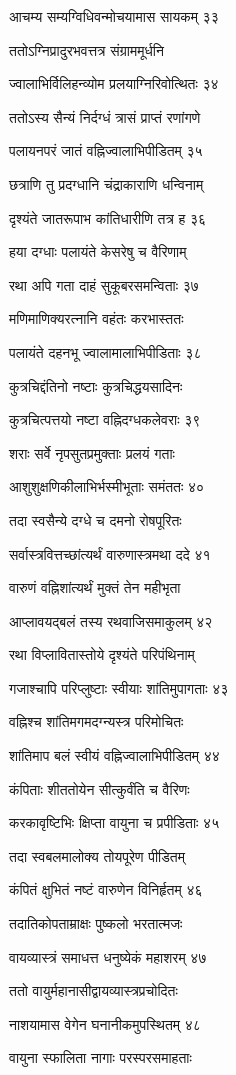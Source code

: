 आचम्य सम्यग्विधिवन्मोचयामास सायकम् ३३

ततोऽग्निप्रादुरभवत्तत्र संग्राममूर्धनि

ज्वालाभिर्विलिहन्व्योम प्रलयाग्निरिवोत्थितः ३४

ततोऽस्य सैन्यं निर्दग्धं त्रासं प्राप्तं रणांगणे

पलायनपरं जातं वह्निज्वालाभिपीडितम् ३५

छत्राणि तु प्रदग्धानि चंद्राकाराणि धन्विनाम्

दृश्यंते जातरूपाभ कांतिधारीणि तत्र ह ३६

हया दग्धाः पलायंते केसरेषु च वैरिणाम्

रथा अपि गता दाहं सुकूबरसमन्विताः ३७

मणिमाणिक्यरत्नानि वहंतः करभास्ततः

पलायंते दहनभू ज्वालामालाभिपीडिताः ३८

कुत्रचिद्दंतिनो नष्टाः कुत्रचिद्धयसादिनः

कुत्रचित्पत्तयो नष्टा वह्निदग्धकलेवराः ३९

शराः सर्वे नृपसुतप्रमुक्ताः प्रलयं गताः

आशुशुक्षणिकीलाभिर्भस्मीभूताः समंततः ४०

तदा स्वसैन्ये दग्धे च दमनो रोषपूरितः

सर्वास्त्रवित्तच्छांत्यर्थं वारुणास्त्रमथा ददे ४१

वारुणं वह्निशांत्यर्थं मुक्तं तेन महीभृता

आप्लावयद्बलं तस्य रथवाजिसमाकुलम् ४२

रथा विप्लावितास्तोये दृश्यंते परिपंथिनाम्

गजाश्चापि परिप्लुष्टाः स्वीयाः शांतिमुपागताः ४३

वह्निश्च शांतिमगमदग्न्यस्त्र परिमोचितः

शांतिमाप बलं स्वीयं वह्निज्वालाभिपीडितम् ४४

कंपिताः शीततोयेन सीत्कुर्वंति च वैरिणः

करकावृष्टिभिः क्षिप्ता वायुना च प्रपीडिताः ४५

तदा स्वबलमालोक्य तोयपूरेण पीडितम्

कंपितं क्षुभितं नष्टं वारुणेन विनिर्हृतम् ४६

तदातिकोपताम्राक्षः पुष्कलो भरतात्मजः

वायव्यास्त्रं समाधत्त धनुष्येकं महाशरम् ४७

ततो वायुर्महानासीद्वायव्यास्त्रप्रचोदितः

नाशयामास वेगेन घनानीकमुपस्थितम् ४८

वायुना स्फालिता नागाः परस्परसमाहताः

